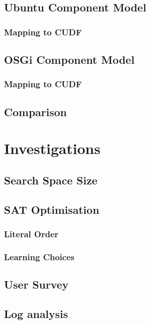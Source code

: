 \documentclass{report}
\begin{document}
\section{Ubuntu Component Model}
\subsection{Mapping to CUDF}

\section{OSGi Component Model}
\subsection{Mapping to CUDF}

\section{Comparison}

\chapter{Investigations}

\section{Search Space Size}

\section{SAT Optimisation}
\subsection{Literal Order}
\subsection{Learning Choices}



\section{User Survey}
\section{Log analysis}
\end{document}
